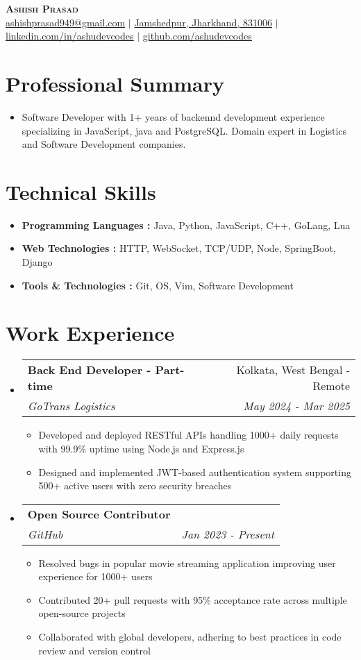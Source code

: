 \documentclass[letterpaper,11pt]{article}
\makeatletter
\newcommand{\resumeItem}[1]{
  \item\small{
    {#1 \vspace{-2pt}}
  }
}
\newcommand{\resumeSubheading}[4]{
  \vspace{-2pt}\item
    \begin{tabular*}{0.97\textwidth}[t]{l@{\extracolsep{\fill}}r}
      \textbf{#1} & #2 \\
      \textit{\small#3} & \textit{\small #4} \\
    \end{tabular*}\vspace{-7pt}
}
\newcommand{\resumeSubHeadingListStart}{\begin{itemize}[leftmargin=0.15in, label={}]}
\newcommand{\resumeSubHeadingListEnd}{\end{itemize}}
\newcommand{\resumeItemListStart}{\begin{itemize}}
\newcommand{\resumeItemListEnd}{\end{itemize}\vspace{-5pt}}
\makeatother
\begin{document}
\begin{center}
    \textbf{\Huge \scshape Ashish Prasad} \\ \vspace{10pt}
    \small \href{mailto:email@example.com}{{ashishprasad949@gmail.com}} $|$ 
    \href{https://github.com/ashudevcodes}{{Jamshedpur, Jharkhand, 831006}} $|$    
    \href{https://www.linkedin.com/in/ashudevcodes/}{{\underline{linkedin.com/in/ashudevcodes}}} $|$
    \href{https://github.com/ashudevcodes}{{\underline{github.com/ashudevcodes}}}    
\end{center}

\section{Professional Summary}
    \resumeItemListStart
        \resumeItem{Software Developer with 1+ years of backennd development experience specializing in JavaScript, java and PostgreSQL. Domain expert in Logistics and Software Development companies.}
\resumeItemListEnd

\section{Technical Skills}
    \resumeItemListStart
        \resumeItem{\textbf{Programming Languages : }{Java, Python, JavaScript, C++, GoLang, Lua}}
        \resumeItem{\textbf{Web Technologies : }{HTTP, WebSocket, TCP/UDP, Node, SpringBoot, Django}}
        \resumeItem{\textbf{Tools \& Technologies : }{Git, OS, Vim, Software Development}}
\resumeItemListEnd

\section{Work Experience}
  \resumeSubHeadingListStart

  \resumeSubheading
    {Back End Developer - Part-time}{Kolkata, West Bengal - Remote}
    {GoTrans Logistics }{May 2024 - Mar 2025}
        \resumeItemListStart
            \resumeItem{Developed and deployed RESTful APIs handling 1000+ daily requests with 99.9\% uptime using Node.js and Express.js}
            \resumeItem{Designed and implemented JWT-based authentication system supporting 500+ active users with zero security breaches}
        \resumeItemListEnd
        
\resumeSubheading
    {Open Source Contributor}{}
    {GitHub}{Jan 2023 - Present}
        \resumeItemListStart
            \resumeItem{Resolved bugs in popular movie streaming application improving user experience for 1000+ users}
            \resumeItem{Contributed 20+ pull requests with 95\% acceptance rate across multiple open-source projects}
            \resumeItem{Collaborated with global developers, adhering to best practices in code review and version control}
        \resumeItemListEnd
  \resumeSubHeadingListEnd
\end{document}
